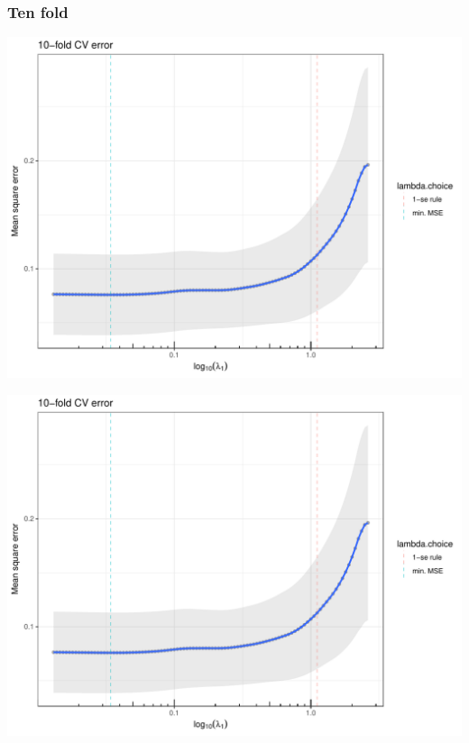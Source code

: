 \documentclass[10pt, c, xcolor=x11names]{beamer}\usepackage[]{graphicx}\usepackage[]{color}
\newenvironment{knitrout}{}{} %
\begin{document}
\begin{frame}[containsverbatim]
  \frametitle{Ten fold}
\begin{knitrout}\scriptsize
{}\color{fgcolor}
\includegraphics[width=.8\textwidth]{figures/crit_lassounnamed-chunk-37-1} 

\includegraphics[width=.8\textwidth]{figures/crit_lassounnamed-chunk-37-2} 

\end{knitrout}
\end{frame}
\end{document}
